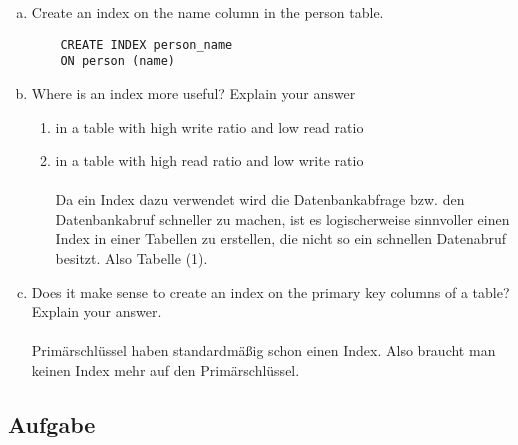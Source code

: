 \documentclass[11pt,a4paper,DIV=9]{scrartcl}
\newcounter{temp}
\newcommand{\aufgabe}[1]{
  \setcounter{temp}{\value{subsection}}
  \setcounter{subsection}{#1}
  \addtocounter{subsection}{-1}
  \subsection{Aufgabe}
  \setcounter{subsection}{\value{temp}}
}
\begin{document}
    \begin{enumerate}[a.]
    \item Create an index on the name column in the person table.
    \begin{lstlisting}
    CREATE INDEX person_name
    ON person (name)
    \end{lstlisting}
    \item Where is an index more useful? Explain your answer
    \begin{enumerate}[1.]
    \item in a table with high write ratio and low read ratio
    \item in a table with high read ratio and low write ratio
    \\\\Da ein Index dazu verwendet wird die Datenbankabfrage bzw. den Datenbankabruf schneller zu machen, ist es logischerweise sinnvoller einen Index in einer Tabellen zu erstellen, die nicht so ein schnellen Datenabruf besitzt. Also Tabelle (1).
    \end{enumerate}
    \item Does it make sense to create an index on the primary key columns of a table? Explain your answer. \\\\
    Prim\"arschl\"ussel haben standardm\"a{\ss}ig schon einen Index. Also braucht man keinen Index mehr auf den Prim\"arschl\"ussel.
    \end{enumerate}
    \aufgabe{4}
\end{document}
